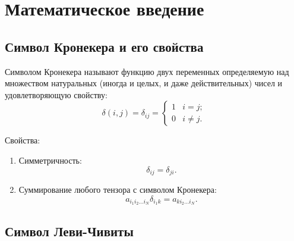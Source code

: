 \documentclass[a4paper,14pt]{extreport} %
\begin{document}
	
	\tableofcontents
	
	\chapter{Математическое введение}
	
	\section{Символ Кронекера и его свойства}
	
	Символом Кронекера называют функцию двух переменных определяемую над множеством натуральных (иногда и целых, и даже действительных) чисел и удовлетворяющую свойству:
	\begin{equation*}
	\delta(i, j) = \delta_{ij} = 
	\begin{cases}
	1 & i = j;\\
	0 & i \ne j.
	\end{cases}
	\end{equation*}
	
	Свойства:
	\begin{enumerate}
	\item Симметричность:
	\[
	\delta_{ij} = \delta_{ji}.
	\]
	\item Суммирование любого тензора с символом Кронекера:
	\[
	a_{i_1 i_2 \ldots i_N} \delta_{i_1 k} = a_{k i_2 \ldots i_N}.
	\]
	\end{enumerate}

	\section{Символ Леви-Чивиты}
\end{document}
